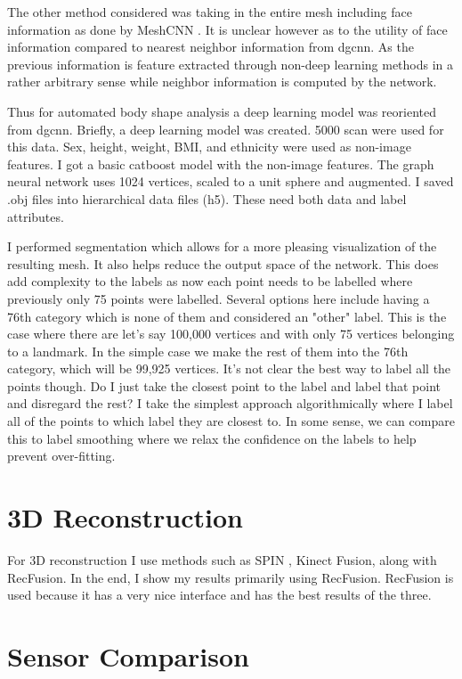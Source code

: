The other method considered was taking in the entire mesh including face information as done by MeshCNN \cite{hanocka2019meshcnn}. It is unclear however as to the utility of face information compared to nearest neighbor information from dgcnn. As the previous information is feature extracted through non-deep learning methods in a rather arbitrary sense while neighbor information is computed by the network.

Thus for automated body shape analysis a deep learning model was reoriented from dgcnn. Briefly, a deep learning model was created. 5000 scan were used for this data. Sex, height, weight, BMI, and ethnicity were used as non-image features. I got a basic catboost model with the non-image features. The graph neural network uses 1024 vertices, scaled to a unit sphere and augmented. I saved .obj files into hierarchical data files (h5). These need both data and label attributes. 

I performed segmentation which allows for a more pleasing visualization of the resulting mesh. It also helps reduce the output space of the network. This does add complexity to the labels as now each point needs to be labelled where previously only 75 points were labelled. Several options here include having a 76th category which is none of them and considered an "other" label. This is the case where there are let's say 100,000 vertices and with only 75 vertices belonging to a landmark. In the simple case we make the rest of them into the 76th category, which will be 99,925 vertices. It's not clear the best way to label all the points though. Do I just take the closest point to the label and label that point and disregard the rest? I take the simplest approach algorithmically where I label all of the points to which label they are closest to. In some sense, we can compare this to label smoothing where we relax the confidence on the labels to help prevent over-fitting.

\section{3D Reconstruction}
For 3D reconstruction I use methods such as SPIN \cite{kolotouros2019learning} , Kinect Fusion, along with RecFusion. In the end, I show my results primarily using RecFusion. RecFusion is used because it has a very nice interface and has the best results of the three.
\section{Sensor Comparison}

